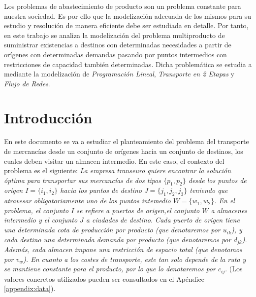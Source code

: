 \documentclass{article}
\begin{document}
  \maketitle

  \abstract \noindent Los problemas de abastecimiento de producto son un problema constante para nuestra sociedad. Es por ello que la modelización adecuada de los mismos para su estudio y resolución de manera eficiente debe ser estudiada en detalle. Por tanto, en este trabajo se analiza la modelización del problema multiproducto de suministrar existencias a destinos con determinadas necesidades a partir de orígenes con determinadas demandas pasando por puntos intermedios con restricciones de capacidad también determinadas. Dicha problemática se estudia a mediante la modelización de \emph{Programación Lineal}, \emph{Transporte en 2 Etapas} y \emph{Flujo de Redes}.


  \section{Introducción}

    \paragraph{}
    En este documento se va a estudiar el planteamiento del problema del transporte de mercancías desde un conjunto de orígenes hacia un conjunto de destinos, los cuales deben visitar un almacen intermedio. En este caso, el contexto del problema es el siguiente: \emph{La empresa transeuro quiere encontrar la solución óptima para transportar sus mercancías de dos tipos $\{p_1, p_2\}$ desde los puntos de origen $I = \{i_1, i_2\}$ hacia los puntos de destino $J = \{j_1, j_2, j_3\}$ teniendo que atravesar obligatoriamente uno de los puntos intemedio $W =\{w_1, w_2\}$. En el problema, el conjunto $I$ se refiere a puertos de origen,el conjunto $W$ a almacenes intermedio y el conjunto $J$ a ciudades de destino. Cada puerto de origen tiene una determinada cota de producción por producto (que denotaremos por $u_{ik}$), y cada destino una determinada demanda por producto (que denotaremos por $d_{jk}$). Además, cada almacen impone una restricción de espacio total (que denotamos por $v_{w}$). En cuanto a los costes de transporte, este tan solo depende de la ruta y se mantiene constante para el producto, por lo que lo denotaremos por $c_{ij}$}. (Los valores concretos utilizados pueden ser consultados en el Apéndice \ref{appendix:data}).
\end{document}
